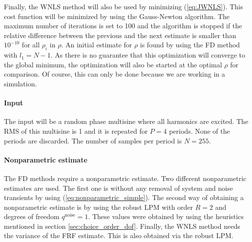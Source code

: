 Finally, the WNLS method will also be used by minimizing (\ref{eq:JWNLS}). This cost function will be minimized by using the Gauss-Newton algorithm. The maximum number of iterations is set to 100 and the algorithm is stopped if the relative difference between the previous and the next estimate is smaller than $10^{-10}$ for all $\rho_i$ in $\rho$. An initial estimate for $\rho$ is found by using the FD method with $l_1 = N-1$. As there is no guarantee that this optimization will converge to the global minimum, the optimization will also be started at the optimal $\rho$ for comparison. Of course, this can only be done because we are working in a simulation.


\paragraph{Input}
The input will be a random phase multisine where all harmonics are excited. The RMS of this multisine is 1 and it is repeated for $P=4$ periods. None of the periods are discarded. The number of samples per period is $N=255$. 

\paragraph{Nonparametric estimate}
The FD methods require a nonparametric estimate. Two different nonparametric estimates are used. The first one is without any removal of system and noise transients by using (\ref{eq:nonparametric_simple}). The second way of obtaining a nonparametric estimate is by using the robust LPM with order $R=2$ and degrees of freedom $q^{\mathrm{noise}}=1$. These values were obtained by using the heuristics mentioned in section \ref{sec:choice_order_dof}. Finally, the WNLS method needs the variance of the FRF estimate. This is also obtained via the robust LPM.

